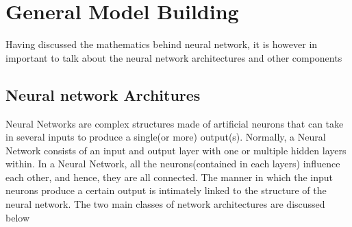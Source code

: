 \documentclass[a4paper,11pt,oneside]{book}
\begin{document}
 \section{General Model Building}
 Having discussed the mathematics behind neural network, it is however in important to talk about the neural network architectures and other components
 \subsection{Neural network Architures}
 Neural Networks are complex structures made of artificial neurons that can take in several inputs to produce a single(or more) output(s). Normally, a Neural Network consists of an input and output layer with one or multiple hidden layers within. In a Neural Network, all the neurons(contained in each layers) influence each other, and hence, they are all connected. The manner in which the input neurons produce a certain output is intimately linked
 to the structure of the neural network. The two main classes of network architectures are discussed below
\end{document}
